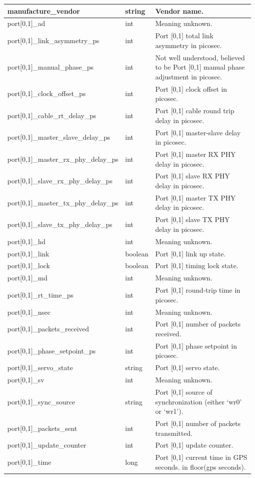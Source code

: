 \documentclass{article}
\begin{document}
{\begin{center}
\begin{tabular}{| p{5cm} | p{2cm} | p{10cm} |}
manufacture\_vendor& string & Vendor name. \\\hline
port[0,1]\_ad & int & Meaning unknown. \\\hline
port[0,1]\_link\_asymmetry\_ps & int & Port [0,1] total link asymmetry in picosec. \\\hline
port[0,1]\_manual\_phase\_ps & int & Not well understood, believed to be Port [0,1] manual phase adjustment in picosec. \\\hline
port[0,1]\_clock\_offset\_ps & int & Port [0,1] clock offset in picosec. \\\hline
port[0,1]\_cable\_rt\_delay\_ps & int & Port [0,1] cable round trip delay in picosec. \\\hline
port[0,1]\_master\_slave\_delay\_ps & int & Port [0,1] master-slave delay in picosec. \\\hline
port[0,1]\_master\_rx\_phy\_delay\_ps & int & Port [0,1] master RX PHY delay in picosec. \\\hline
port[0,1]\_slave\_rx\_phy\_delay\_ps & int & Port [0,1] slave RX PHY delay in picosec. \\\hline
port[0,1]\_master\_tx\_phy\_delay\_ps & int & Port [0,1] master TX PHY delay in picosec. \\\hline
port[0,1]\_slave\_tx\_phy\_delay\_ps & int & Port [0,1] slave TX PHY delay in picosec. \\\hline
port[0,1]\_hd & int & Meaning unknown. \\\hline
port[0,1]\_link & boolean & Port [0,1] link up state. \\\hline
port[0,1]\_lock & boolean & Port [0,1] timing lock state. \\\hline
port[0,1]\_md & int & Meaning unknown. \\\hline
port[0,1]\_rt\_time\_ps & int & Port [0,1] round-trip time in picosec. \\\hline
port[0,1]\_nsec & int & Meaning unknown. \\\hline
port[0,1]\_packets\_received & int & Port [0,1] number of packets received. \\\hline
port[0,1]\_phase\_setpoint\_ps & int & Port [0,1] phase setpoint in picosec. \\\hline
port[0,1]\_servo\_state & string & Port [0,1] servo state. \\\hline
port[0,1]\_sv & int & Meaning unknown. \\\hline
port[0,1]\_sync\_source & string & Port [0,1] source of synchronization (either `wr0' or `wr1'). \\\hline
port[0,1]\_packets\_sent & int & Port [0,1] number of packets transmitted. \\\hline
port[0,1]\_update\_counter& int & Port [0,1] update counter. \\\hline
port[0,1]\_time & long & Port [0,1] current time in GPS seconds. in floor(gps seconds). \\\hline


\end{tabular}
\end{center}}
\end{document}
